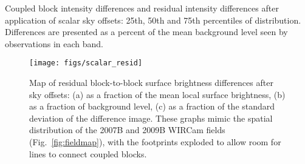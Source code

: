 \documentclass[iop,tighten]{emulateapj}
\newcommand{\Fig}[1]{Fig.~\ref{fig:#1}}  %
\begin{document}
\begin{table}[t]
\centering
\caption[Coupled block differences and residual differences after
scalar sky offsets]{Coupled block intensity differences and residual intensity differences after application of scalar sky offsets: 25th, 50th and 75th percentiles of distribution.
Differences are presented as a percent of the mean background level seen by observations in each band.
}

\label{tab:nightset_medsky_scalar_resid_diffs}
\end{table}

\begin{figure}[t]
\centering
\texttt{[image: figs/scalar\_resid]}
\caption{Map of residual block-to-block surface brightness differences after sky offsets: (a) as a fraction of the mean local surface brightness, (b) as a fraction of background level, (c) as a fraction of the standard deviation of the difference image.
These graphs mimic the spatial distribution of the 2007B and 2009B WIRCam fields (\Fig{fieldmap}), with the footprints exploded to allow room for lines to connect coupled blocks.}
\label{fig:scalar_resid}
\end{figure}



\end{document}

